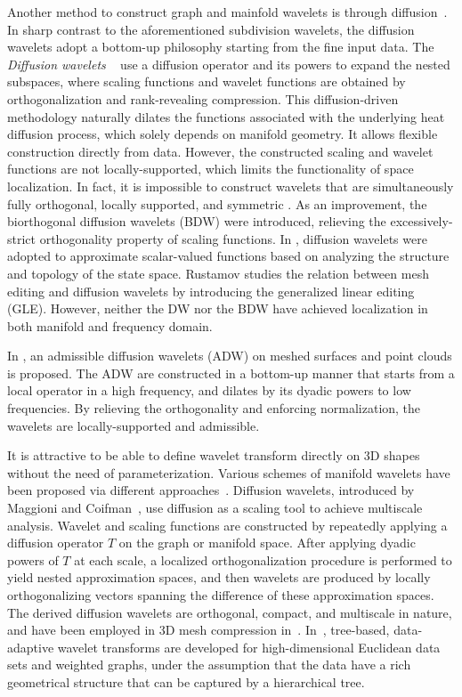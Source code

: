 Another method to construct graph and mainfold wavelets is
through diffusion~\cite{Coifman2006, Hou2013}.
In sharp contrast to the aforementioned subdivision wavelets, the diffusion
wavelets adopt a bottom-up philosophy starting from the fine input data.
The \emph{Diffusion wavelets} ~\cite{Coifman2006} use a diffusion operator
and its powers to expand the nested subspaces, where scaling functions and
wavelet functions are obtained by orthogonalization and rank-revealing
compression. This diffusion-driven methodology naturally dilates the
functions associated with the underlying heat diffusion process, which solely
depends on manifold geometry. It allows flexible construction directly from data.
However, the constructed scaling and wavelet functions are not locally-supported,
which limits the functionality of space localization. In fact, it is impossible
to construct wavelets that are simultaneously fully orthogonal, locally supported,
and symmetric \cite{Lounsbery:1997:TOG}. As an improvement, the biorthogonal
diffusion wavelets (BDW) \cite{Maggioni:2005:SPIE} were introduced, relieving the
excessively-strict orthogonality property of scaling functions.
In \cite{Mahadevan2005}, diffusion wavelets were adopted to approximate
scalar-valued functions based on analyzing the structure and topology of the
state space. Rustamov \cite{Rustamov:2009:ICMS} studies the relation between
mesh editing and diffusion wavelets by introducing the generalized linear
editing (GLE). However, neither the DW nor the BDW have achieved localization
in both manifold and frequency domain.

In \cite{Hou2013}, an admissible diffusion wavelets (ADW) on meshed surfaces and point clouds is proposed.
The ADW are constructed in a bottom-up manner that starts from a local operator in a high frequency,
and dilates by its dyadic powers to low frequencies. By relieving the orthogonality and enforcing normalization,
the wavelets are locally-supported and admissible.

It is attractive to be able to define wavelet transform directly on 3D
shapes without the need of parameterization. Various schemes of
manifold wavelets have been proposed via different
approaches~\cite{Antoine2010189}. Diffusion wavelets, introduced by
Maggioni and Coifman~\cite{Coifman2006}, use diffusion as a
scaling tool to achieve multiscale analysis. Wavelet and scaling
functions are constructed by repeatedly applying a diffusion operator
$T$ on the graph or manifold space. After applying dyadic powers of
$T$ at each scale, a localized orthogonalization procedure is
performed to yield nested approximation spaces, and then wavelets are
produced by locally orthogonalizing vectors spanning the difference of
these approximation spaces. The derived diffusion wavelets are
orthogonal, compact, and multiscale in nature, and have been employed
in 3D mesh compression
in~\cite{mahadevan2007AdaMesCom3DComGraUsiMulManLea}.
In~\cite{gavish2010multiscale,ram2012redundant}, tree-based,
data-adaptive wavelet transforms are developed for high-dimensional
Euclidean data sets and weighted graphs, under the assumption that the
data have a rich geometrical structure that can be captured by a
hierarchical tree.

